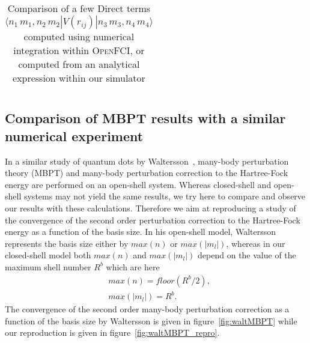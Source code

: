 \begin{table}[ht]
{\begin{tabular}{c|c|c|c|c|c|c|c|c|c|c}
\hline   
\hline  
\end{tabular}
}
 \caption{Comparison of a few Direct terms $\langle n_1 \,m_1,n_2 \,m_2 |V(r_{ij})| n_3 \,m_3,n_4 \,m_4 \rangle$ computed using numerical integration within \textsc{OpenFCI}, or computed from an analytical expression within our simulator}
\label{table:DirectTerms} 
\end{table}


\subsection{Comparison of MBPT results with a similar numerical experiment}
In a similar study of quantum dots by Waltersson~\cite{Waltersson2007}, many-body perturbation theory (MBPT) and many-body perturbation correction to the Hartree-Fock energy are performed on an open-shell system. Whereas closed-shell and open-shell systems may not yield the same results, we try here to compare and observe our results with these calculations.
Therefore we aim at reproducing a study of the convergence of the second order perturbation correction to the Hartree-Fock energy as a function of the basis size. In his open-shell model, Waltersson represents the basis size either by $max(n)$ or $max(|m_l|)$, whereas in our closed-shell model both $max(n)$ and $max(|m_l|)$ depend on the value of the maximum shell number $R^b$ which are here
\begin{align}
 &max(n) = floor(R^b/2), \\
&max(|m_l|) = R^b.
\end{align} 
 The convergence of the second order many-body perturbation correction as a function of the basis size by Waltersson is given in figure~\ref{fig:waltMBPT} while our reproduction is given in figure~\ref{fig:waltMBPT_repro}.


